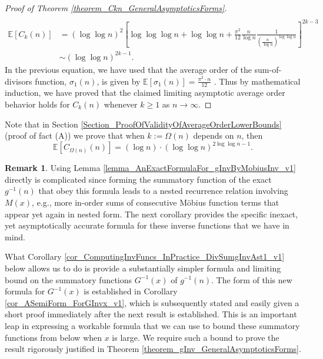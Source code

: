 \documentclass[11pt,reqno,a4letter]{article}
\numberwithin{figure}{section}
\numberwithin{table}{section}
\theoremstyle{plain}
\numberwithin{theorem}{section}
\theoremstyle{definition}
\newtheorem{remark}[theorem]{Remark}
\begin{document}
\begin{proof}[Proof of Theorem \ref{theorem_Ckn_GeneralAsymptoticsForms}]
{\begin{align*}
     \end{align*} 
}
\begin{align*} 
\mathbb{E}[C_k(n)] & = (\log\log n)^2 \left[
     \log\log\log n + \log\log n + \frac{\pi^2}{12} \frac{n}{\log n} \frac{1}{\left( 
     \frac{n}{\log n}\right)^{\log\log n}} 
     \right]^{2k-3} \\ 
     & \sim (\log\log n)^{2k-1}. 
\end{align*} 
In the previous equation, we have used that the average order of the sum-of-divisors function, $\sigma_1(n)$, 
is given by $\mathbb{E}[\sigma_1(n)] = \frac{\pi^2 \cdot n}{12}$ \cite[\S 27.11]{NISTHB}. 
Thus by mathematical induction, we have proved that the claimed limiting asymptotic average order 
behavior holds for $C_k(n)$ whenever $k \geq 1$ as $n \rightarrow \infty$. 
\end{proof} 

Note that in Section \ref{Section_ProofOfValidityOfAverageOrderLowerBounds} 
(proof of fact (A)) we prove that when $k := \Omega(n)$ depends on $n$, then 
\[
\mathbb{E}[C_{\Omega(n)}(n)] = (\log n) \cdot (\log\log n)^{2\log\log n - 1}. 
\]

\begin{remark} 
Using Lemma \ref{lemma_AnExactFormulaFor_gInvByMobiusInv_v1} directly is complicated since 
forming the summatory function of the exact $g^{-1}(n)$ that obey this formula leads to 
a nested recurrence relation involving $M(x)$, e.g., 
more in-order sums of consecutive M\"obius function terms that appear yet again in nested form. 
The next corollary provides the specific 
inexact, yet asymptotically accurate formula for these inverse functions that we have in mind. 

What Corollary \ref{cor_ComputingInvFuncs_InPractice_DivSumgInvAst1_v1} below 
allows us to do is 
provide a substantially simpler formula and limiting bound on the summatory functions 
$G^{-1}(x)$ of $g^{-1}(n)$. The form of this new formula for $G^{-1}(x)$ is 
established in Corollary \ref{cor_ASemiForm_ForGInvx_v1}, which is subsequently stated and 
easily given a short proof immediately after the next result is established. 
This is an important leap in expressing a workable formula that we can use to bound these 
summatory functions from below when $x$ is large. We require such a bound to prove the result 
rigorously justified in Theorem \ref{theorem_gInv_GeneralAsymptoticsForms}. 
\end{remark} 
\end{document}
